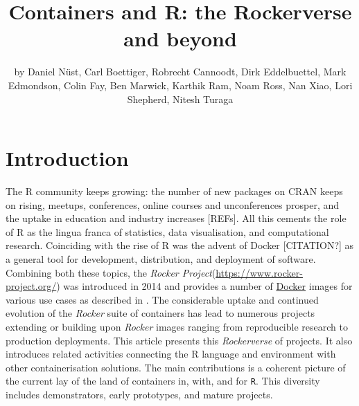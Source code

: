 \title{Containers and R: the Rockerverse and beyond}
\author{by Daniel Nüst, Carl Boettiger, Robrecht Cannoodt, Dirk Eddelbuettel, Mark Edmondson, Colin Fay, Ben Marwick, Karthik Ram, Noam Ross, Nan Xiao, Lori Shepherd, Nitesh Turaga}

\maketitle



\hypertarget{introduction}{%
\section{Introduction}\label{introduction}}

The R community keeps growing: the number of new packages on CRAN keeps
on rising, meetups, conferences, online courses and unconferences
prosper, and the uptake in education and industry increases {[}REFs{]}.
All this cements the role of R as the lingua franca of statistics, data
visualisation, and computational research. Coinciding with the rise of R
was the advent of Docker {[}CITATION?{]} as a general tool for
development, distribution, and deployment of software. Combining both
these topics, the \emph{Rocker
Project}(\url{https://www.rocker-project.org/}) was introduced in 2014
and provides a number of
\href{https://en.wikipedia.org/wiki/Docker_(software)}{Docker} images
for various use cases as described in \citet{RJ-2017-065}. The
considerable uptake and continued evolution of the \emph{Rocker} suite
of containers has lead to numerous projects extending or building upon
\emph{Rocker} images ranging from reproducible research to production
deployments. This article presents this \emph{Rockerverse} of projects.
It also introduces related activities connecting the R language and
environment with other containerisation solutions. The main
contributions is a coherent picture of the current lay of the land of
containers in, with, and for \texttt{R}. This diversity includes
demonstrators, early prototypes, and mature projects.

